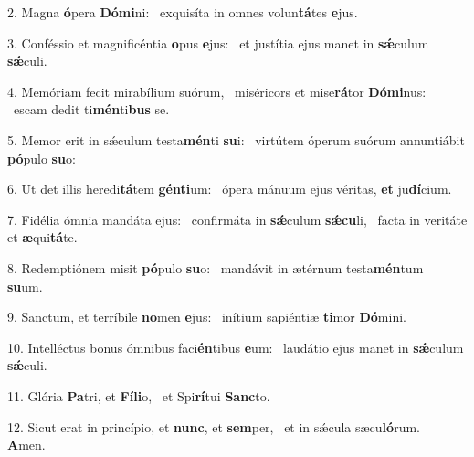 2. Magna \textbf{ó}pera \textbf{Dó}\textbf{mi}ni: \ast\  exquisíta in omnes volun\textbf{tá}tes \textbf{e}jus.\

3. Conféssio et magnificéntia \textbf{o}pus \textbf{e}jus: \ast\  et justítia ejus manet in \textbf{sǽ}culum \textbf{sǽ}culi.\

4. Memóriam fecit mirabílium suórum, \dag\  miséricors et mise\textbf{rá}tor \textbf{Dó}\textbf{mi}nus: \ast\  escam dedit ti\textbf{mén}ti\textbf{bus} se.\

5. Memor erit in sǽculum testa\textbf{mén}ti \textbf{su}i: \ast\  virtútem óperum suórum annuntiábit \textbf{pó}pulo \textbf{su}o:\

6. Ut det illis heredi\textbf{tá}tem \textbf{gén}\textbf{ti}um: \ast\  ópera mánuum ejus véritas, \textbf{et} ju\textbf{dí}cium.\

7. Fidélia ómnia mandáta ejus: \dag\  confirmáta in \textbf{sǽ}culum \textbf{sǽ}\textbf{cu}li, \ast\  facta in veritáte et \textbf{æ}qui\textbf{tá}te.\

8. Redemptiónem misit \textbf{pó}pulo \textbf{su}o: \ast\  mandávit in ætérnum testa\textbf{mén}tum \textbf{su}um.\

9. Sanctum, et terríbile \textbf{no}men \textbf{e}jus: \ast\  inítium sapiéntiæ \textbf{ti}mor \textbf{Dó}mini.\

10. Intelléctus bonus ómnibus faci\textbf{én}tibus \textbf{e}um: \ast\  laudátio ejus manet in \textbf{sǽ}culum \textbf{sǽ}culi.\

11. Glória \textbf{Pa}tri, et \textbf{Fí}\textbf{li}o, \ast\  et Spi\textbf{rí}tui \textbf{Sanc}to.\

12. Sicut erat in princípio, et \textbf{nunc}, et \textbf{sem}per, \ast\  et in sǽcula sæcu\textbf{ló}rum. \textbf{A}men.\

